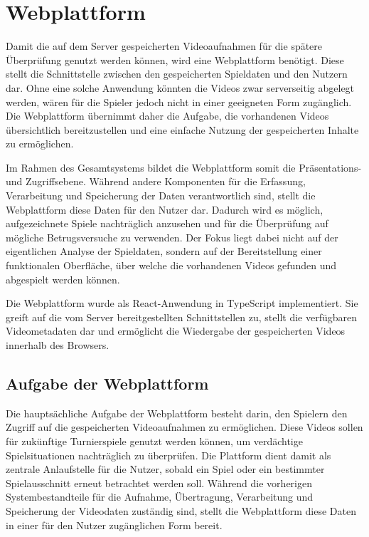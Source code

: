 \chapter{Webplattform} \label{sec:web}

Damit die auf dem Server gespeicherten Videoaufnahmen für die spätere Überprüfung genutzt werden können, wird eine Webplattform benötigt. Diese stellt die Schnittstelle zwischen den gespeicherten Spieldaten und den Nutzern dar. Ohne eine solche Anwendung könnten die Videos zwar serverseitig abgelegt werden, 
wären für die Spieler jedoch nicht in einer geeigneten Form zugänglich. Die Webplattform übernimmt daher die Aufgabe, die vorhandenen Videos übersichtlich bereitzustellen und eine einfache Nutzung der gespeicherten Inhalte zu ermöglichen. 

Im Rahmen des Gesamtsystems bildet die Webplattform somit die Präsentations- und Zugriffsebene. Während andere Komponenten für die Erfassung, Verarbeitung und Speicherung der Daten verantwortlich sind, stellt die Webplattform diese Daten für den Nutzer dar. Dadurch wird es möglich, 
aufgezeichnete Spiele nachträglich anzusehen und für die Überprüfung auf mögliche Betrugsversuche zu verwenden. Der Fokus liegt dabei nicht auf der eigentlichen Analyse der Spieldaten, sondern auf der Bereitstellung einer funktionalen Oberfläche, 
über welche die vorhandenen Videos gefunden und abgespielt werden können.

Die Webplattform wurde als React-Anwendung in TypeScript implementiert. Sie greift auf die vom Server bereitgestellten Schnittstellen zu, stellt die verfügbaren Videometadaten dar und ermöglicht die Wiedergabe der gespeicherten Videos innerhalb des Browsers.

\section{Aufgabe der Webplattform} 

Die hauptsächliche Aufgabe der Webplattform besteht darin, den Spielern den Zugriff auf die gespeicherten Videoaufnahmen zu ermöglichen. Diese Videos sollen für zukünftige Turnierspiele genutzt werden können, um verdächtige Spielsituationen nachträglich zu überprüfen. 
Die Plattform dient damit als zentrale Anlaufstelle für die Nutzer, sobald ein Spiel oder ein bestimmter Spielausschnitt erneut betrachtet werden soll. Während die vorherigen Systembestandteile für die Aufnahme, Übertragung, Verarbeitung und Speicherung der Videodaten zuständig sind, 
stellt die Webplattform diese Daten in einer für den Nutzer zugänglichen Form bereit. 

